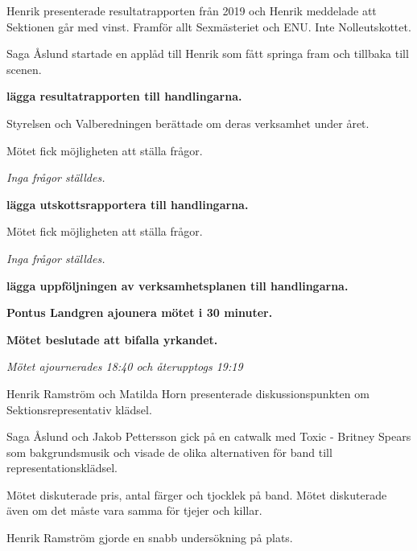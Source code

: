 \documentclass[10pt]{article}
\begin{document}
\begin{paragrafer}


Henrik presenterade resultatrapporten från 2019 och Henrik meddelade att Sektionen går med vinst. Framför allt Sexmästeriet och ENU. Inte Nolleutskottet. 

Saga Åslund startade en applåd till Henrik som fått springa fram och tillbaka till scenen. 

\textbf{\Mba lägga resultatrapporten till handlingarna.}

Styrelsen och Valberedningen berättade om deras verksamhet under året.

Mötet fick möjligheten att ställa frågor.

\textit{Inga frågor ställdes.}

\textbf{\Mba lägga utskottsrapportera till handlingarna.}


Mötet fick möjligheten att ställa frågor.

\textit{Inga frågor ställdes.}

\textbf{\Mba lägga uppföljningen av verksamhetsplanen till handlingarna.}


\textbf{Pontus Landgren \ypa ajounera mötet i 30 minuter.}

\textbf{Mötet beslutade att bifalla yrkandet.}

\textit{Mötet ajournerades 18:40 och återupptogs 19:19}


Henrik Ramström och Matilda Horn presenterade diskussionspunkten om Sektionsrepresentativ klädsel. 

Saga Åslund och Jakob Pettersson gick på en catwalk med Toxic - Britney Spears som bakgrundsmusik och visade de olika alternativen för band till representationsklädsel.

Mötet diskuterade pris, antal färger och tjocklek på band. Mötet diskuterade även om det måste vara samma för tjejer och killar. 


Henrik Ramström gjorde en snabb undersökning på plats. 


\end{paragrafer}
\end{document}
